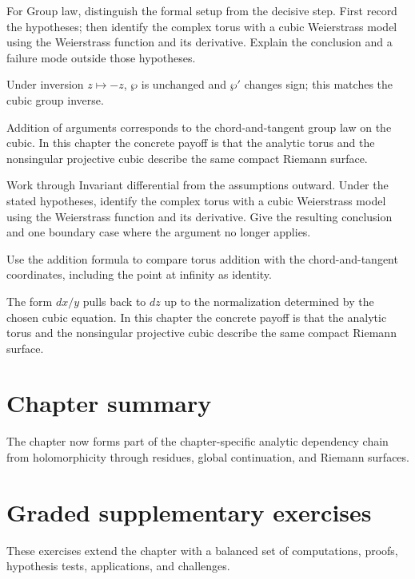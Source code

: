 \begin{exercise}\label{exr:iv31-07}
For Group law, distinguish the formal setup from the decisive step. First record the hypotheses; then identify the complex torus with a cubic Weierstrass model using the Weierstrass function and its derivative. Explain the conclusion and a failure mode outside those hypotheses.
\end{exercise}
\begin{hint}
Under inversion \(z\mapsto-z\), \(\wp\) is unchanged and \(\wp'\) changes sign; this matches the cubic group inverse.
\end{hint}
\begin{solution}
Addition of arguments corresponds to the chord-and-tangent group law on the cubic. In this chapter the concrete payoff is that the analytic torus and the nonsingular projective cubic describe the same compact Riemann surface.
\end{solution}

\begin{exercise}\label{exr:iv31-08}
Work through Invariant differential from the assumptions outward. Under the stated hypotheses, identify the complex torus with a cubic Weierstrass model using the Weierstrass function and its derivative. Give the resulting conclusion and one boundary case where the argument no longer applies.
\end{exercise}
\begin{hint}
Use the addition formula to compare torus addition with the chord-and-tangent coordinates, including the point at infinity as identity.
\end{hint}
\begin{solution}
The form $dx/y$ pulls back to $dz$ up to the normalization determined by the chosen cubic equation. In this chapter the concrete payoff is that the analytic torus and the nonsingular projective cubic describe the same compact Riemann surface.
\end{solution}

\section*{Chapter summary}
The chapter now forms part of the chapter-specific analytic dependency chain from holomorphicity through residues, global continuation, and Riemann surfaces.
\section{Graded supplementary exercises}
These exercises extend the chapter with a balanced set of computations, proofs, hypothesis tests, applications, and challenges.

